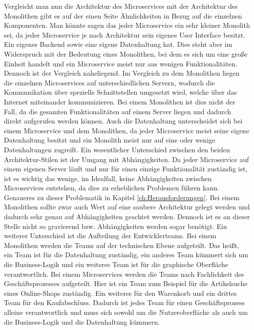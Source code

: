 Vergleicht man nun die Architektur des Microservices mit der Architektur des Monolithen gibt es auf der einen Seite Ähnlichkeiten in Bezug auf die einzelnen Komponenten.\newline
Man könnte sagen das jeder Microservice ein sehr kleiner Monolith sei, da jeder Microservice je nach Architektur sein eigenes User Interface besitzt. Ein eigenes Backend sowie eine eigene Datenhaltung hat. Dies steht aber im Widerspruch mit der Bedeutung eines Monolithen, bei dem es sich um eine große Einheit handelt und ein Microservice meist nur aus wenigen Funktionalitäten. Dennoch ist der Vergleich naheliegend.\newline
Im Vergleich zu dem Monolithen liegen die einzelnen Microservices auf unterschiedlichen Servern, wodurch die Kommunikation über spezielle Schnittstellen umgesetzt wird, welche über das Internet miteinander kommunizieren. Bei einem Monolithen ist dies nicht der Fall, da die gesamten Funktionalitäten auf einem Server liegen und dadurch direkt aufgerufen werden können. Auch die Datenhaltung unterscheidet sich bei einem Microservice und dem Monolithen, da jeder Microservice meist seine eigene Datenhaltung besitzt und ein Monolith meist nur auf eine oder wenige Datenhaltungen zugreift.\newline
Ein wesentlicher Unterschied zwischen den beiden Architektur-Stilen ist der Umgang mit Abhängigkeiten. Da jeder Microservice auf einem eigenen Server läuft und nur für einen einzige Funktionalität zuständig ist, ist es wichtig das wenige, im Idealfall, keine Abhängigkeiten zwischen Microservices entstehen, da dies zu erheblichen Problemen führen kann. Genaueres zu dieser Problematik in Kapitel \ref{ch:Herausforderungen}.\newline
Bei einem Monolithen sollte zwar auch Wert auf eine saubere Architektur gelegt werden und dadurch sehr genau auf Abhängigkeiten geachtet werden. Dennoch ist es an dieser Stelle nicht so gravierend bzw. Abhängigkeiten werden sogar benötigt. 
Ein weiterer Unterschied ist die Aufteilung der Entwicklerteams. Bei einem Monolithen werden die Teams auf der technischen Ebene aufgeteilt. Das heißt, ein Team ist für die Datenhaltung zuständig, ein anderes Team kümmert sich um die Business-Logik und ein weiteres Team ist für die graphische Oberfläche verantwortlich.\newline
Bei einem Microservices werden die Teams nach Fachlichkeit des Geschäftsprozesses aufgeteilt. \newline
Hier ist ein Team zum Beispiel für die Artikelsuche eines Online-Shops zuständig. Ein weiteres für den Warenkorb und ein drittes Team für den Kaufabschluss. Dadurch ist jedes Team für einen Geschäftsprozess alleine verantwortlich und muss sich sowohl um die Nutzeroberfläche als auch um die Business-Logik und die Datenhaltung kümmern.\newpage


